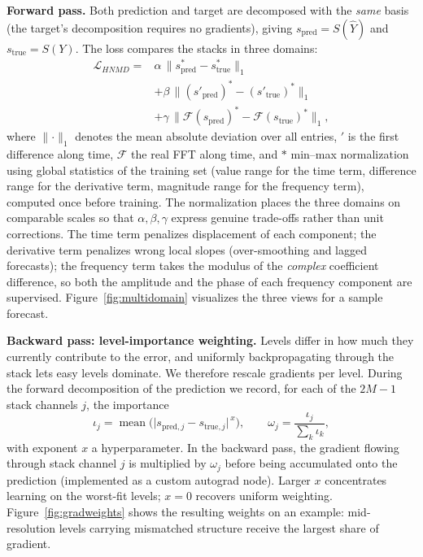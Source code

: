 \documentclass[11pt,twocolumn]{article}
\newcommand{\methodName}{HNMD\xspace}
\begin{document}
\textbf{Forward pass.} Both prediction and target are decomposed with the \emph{same} basis (the target's decomposition requires no gradients), giving $s_{\mathrm{pred}} = S(\hat{Y})$ and $s_{\mathrm{true}} = S(Y)$. The loss compares the stacks in three domains:
\begin{equation}
\label{eq:loss}
\begin{split}
\mathcal{L}_{\methodName} ={}& \alpha \, \big\lVert s^{*}_{\mathrm{pred}} - s^{*}_{\mathrm{true}} \big\rVert_1 \\
&+ \beta \, \big\lVert (s'_{\mathrm{pred}})^{*} - (s'_{\mathrm{true}})^{*} \big\rVert_1 \\
&+ \gamma \, \big\lVert \mathcal{F}(s_{\mathrm{pred}})^{*} - \mathcal{F}(s_{\mathrm{true}})^{*} \big\rVert_1,
\end{split}
\end{equation}
where $\lVert\cdot\rVert_1$ denotes the mean absolute deviation over all entries, $'$ is the first difference along time, $\mathcal{F}$ the real FFT along time, and $*$ min--max normalization using global statistics of the training set (value range for the time term, difference range for the derivative term, magnitude range for the frequency term), computed once before training. The normalization places the three domains on comparable scales so that $\alpha, \beta, \gamma$ express genuine trade-offs rather than unit corrections. The time term penalizes displacement of each component; the derivative term penalizes wrong local slopes (over-smoothing and lagged forecasts); the frequency term takes the modulus of the \emph{complex} coefficient difference, so both the amplitude and the phase of each frequency component are supervised. Figure~\ref{fig:multidomain} visualizes the three views for a sample forecast.

\textbf{Backward pass: level-importance weighting.} Levels differ in how much they currently contribute to the error, and uniformly backpropagating through the stack lets easy levels dominate. We therefore rescale gradients per level. During the forward decomposition of the prediction we record, for each of the $2M-1$ stack channels $j$, the importance
\begin{equation}
\iota_j = \operatorname{mean}\big( \lvert s_{\mathrm{pred},j} - s_{\mathrm{true},j} \rvert^{\,x} \big),
\qquad
\omega_j = \frac{\iota_j}{\sum_k \iota_k},
\end{equation}
with exponent $x$ a hyperparameter. In the backward pass, the gradient flowing through stack channel $j$ is multiplied by $\omega_j$ before being accumulated onto the prediction (implemented as a custom autograd node). Larger $x$ concentrates learning on the worst-fit levels; $x = 0$ recovers uniform weighting. Figure~\ref{fig:gradweights} shows the resulting weights on an example: mid-resolution levels carrying mismatched structure receive the largest share of gradient.
\end{document}
